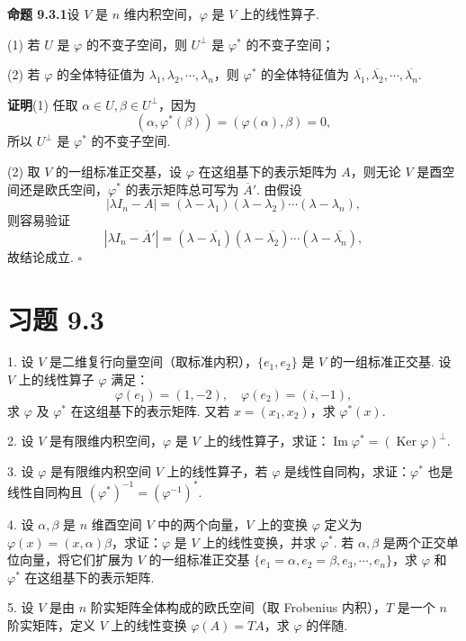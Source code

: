 \documentclass[UTF8,12pt,a4paper,fontset=fandol]{ctexart}
\begin{document}
\noindent\textbf{命题 9.3.1}\quad 设 $V$ 是 $n$ 维内积空间，$\varphi$ 是 $V$ 上的线性算子.

(1) 若 $U$ 是 $\varphi$ 的不变子空间，则 $U^\perp$ 是 $\varphi^*$ 的不变子空间；

(2) 若 $\varphi$ 的全体特征值为 $\lambda_1,\lambda_2,\cdots,\lambda_n$，则 $\varphi^*$ 的全体特征值为 $\overline{\lambda_1},\overline{\lambda_2},\cdots,\overline{\lambda_n}$.

\noindent\textbf{证明}\quad (1) 任取 $\alpha\in U,\beta\in U^\perp$，因为
\[
  (\alpha,\varphi^*(\beta))=(\varphi(\alpha),\beta)=0,
\]
所以 $U^\perp$ 是 $\varphi^*$ 的不变子空间.

(2) 取 $V$ 的一组标准正交基，设 $\varphi$ 在这组基下的表示矩阵为 $A$，则无论 $V$ 是酉空间还是欧氏空间，$\varphi^*$ 的表示矩阵总可写为 $\overline A'$. 由假设
\[
  |\lambda I_n-A|=(\lambda-\lambda_1)(\lambda-\lambda_2)\cdots(\lambda-\lambda_n),
\]
则容易验证
\[
  |\lambda I_n-\overline A'|=(\lambda-\overline{\lambda_1})(\lambda-\overline{\lambda_2})\cdots(\lambda-\overline{\lambda_n}),
\]
故结论成立. $\square$

\section*{习题 9.3}

1. 设 $V$ 是二维复行向量空间（取标准内积），$\{e_1,e_2\}$ 是 $V$ 的一组标准正交基. 设 $V$ 上的线性算子 $\varphi$ 满足：
\[
  \varphi(e_1)=(1,-2),\quad \varphi(e_2)=(i,-1),
\]
求 $\varphi$ 及 $\varphi^*$ 在这组基下的表示矩阵. 又若 $x=(x_1,x_2)$，求 $\varphi^*(x)$.

2. 设 $V$ 是有限维内积空间，$\varphi$ 是 $V$ 上的线性算子，求证：$\operatorname{Im}\varphi^*=(\operatorname{Ker}\varphi)^\perp$.

3. 设 $\varphi$ 是有限维内积空间 $V$ 上的线性算子，若 $\varphi$ 是线性自同构，求证：$\varphi^*$ 也是线性自同构且 $(\varphi^*)^{-1}=(\varphi^{-1})^*$.

4. 设 $\alpha,\beta$ 是 $n$ 维酉空间 $V$ 中的两个向量，$V$ 上的变换 $\varphi$ 定义为 $\varphi(x)=(x,\alpha)\beta$，求证：$\varphi$ 是 $V$ 上的线性变换，并求 $\varphi^*$. 若 $\alpha,\beta$ 是两个正交单位向量，将它们扩展为 $V$ 的一组标准正交基 $\{e_1=\alpha,e_2=\beta,e_3,\cdots,e_n\}$，求 $\varphi$ 和 $\varphi^*$ 在这组基下的表示矩阵.

5. 设 $V$ 是由 $n$ 阶实矩阵全体构成的欧氏空间（取 Frobenius 内积），$T$ 是一个 $n$ 阶实矩阵，定义 $V$ 上的线性变换 $\varphi(A)=TA$，求 $\varphi$ 的伴随.
\end{document}
